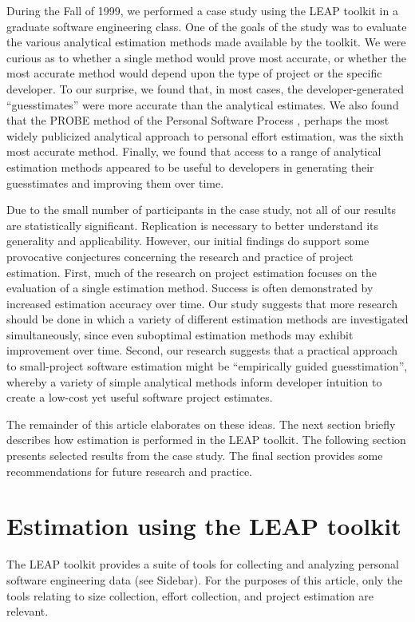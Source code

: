 During the Fall of 1999, we performed a case study using the LEAP toolkit
in a graduate software engineering class.  One of the goals of the study
was to evaluate the various analytical estimation methods made available by
the toolkit.  We were curious as to whether a single method would prove
most accurate, or whether the most accurate method would depend upon the
type of project or the specific developer.  To our surprise, we found that,
in most cases, the developer-generated ``guesstimates'' were more accurate
than the analytical estimates.  We also found that the PROBE method of the
Personal Software Process \cite{Humphrey95}, perhaps the most widely
publicized analytical approach to personal effort estimation, was the sixth
most accurate method.  Finally, we found that access to a range of
analytical estimation methods appeared to be useful to developers in
generating their guesstimates and improving them over time. 

Due to the small number of participants in the case study, not all of our
results are statistically significant.  Replication is necessary 
to better understand its generality and applicability.  However, our
initial findings do support some provocative conjectures concerning the
research and practice of project estimation. First, much of the research on
project estimation focuses on the evaluation of a single estimation
method.  Success is often demonstrated by increased estimation accuracy
over time. Our study suggests that more research should be done in which a
variety of different estimation methods are investigated
simultaneously, since even suboptimal estimation methods may exhibit
improvement over time.  Second, our research suggests that a practical
approach to small-project software estimation might be ``empirically guided
guesstimation'', whereby a variety of simple analytical methods inform
developer intuition to create a low-cost yet useful software project
estimates.

The remainder of this article elaborates on these ideas. The next section
briefly describes how estimation is performed in the LEAP toolkit.  The
following section presents selected results from the case study. The final
section provides some recommendations for future research and practice.

\section{Estimation using the LEAP toolkit}

The LEAP toolkit provides a suite of tools for collecting and analyzing 
personal software engineering data (see Sidebar).  For the purposes of
this article, only the tools relating to size collection, effort collection,
and project estimation are relevant. 

